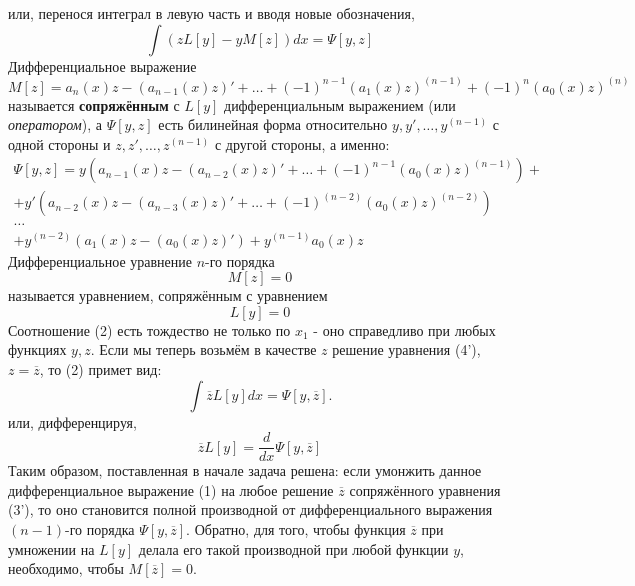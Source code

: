 или, перенося интеграл в левую часть и вводя новые обозначения,
\[
	\int \left( zL[y] - yM[z]\right)dx = \Psi[y,z] \tag{2}
\]
Дифференциальное выражение
\[
	M[z] = a_n(x)z-(a_{n-1}(x)z)' + \dots + (-1)^{n-1} (a_1(x)z)^{(n-1)} + (-1)^n (a_0(x)z)^{(n)} \tag{3}
\]
называется \textbf{сопряжённым} с $L[y]$ дифференциальным выражением (или \textit{оператором}), а $\Psi[y,z]$ есть билинейная форма относительно $y,y',\dots,y^{(n-1)}$ с одной стороны и $z,z',\dots,z^{(n-1)}$ с другой стороны, а именно:
\[
	\begin{aligned}
		\Psi[y,z] = y\left(a_{n-1}(x)z-(a_{n-2}(x)z)'+\dots+(-1)^{n-1}(a_0(x)z)^{(n-1)}\right) + \\
		+ y'\left(a_{n-2}(x)z-(a_{n-3}(x)z)'+\dots + (-1)^{(n-2)}(a_0(x)z)^{(n-2)}\right)\\
		\dots \\
		+ y^{(n-2)}\left(a_1(x)z-(a_0(x)z)' \right) + y^{(n-1)} a_0(x)z
	\end{aligned} \tag{3'}
\]
Дифференциальное уравнение $n$-го порядка
\[
	M[z] = 0 \tag{4'}
\]
называется уравнением, сопряжённым с уравнением
\[
	L[y] = 0 \tag{4}
\]
Соотношение (2) есть тождество не только по $x_1$ - оно справедливо при любых функциях $y,z$. Если мы теперь возьмём в качестве $z$ решение уравнения (4'), $z=\overline{z}$, то (2) примет вид:
\[
	\int \overline{z} L[y]dx = \Psi\left[ y, \overline{z}\right].
\]
или, дифференцируя,
\[
	\overline{z} L[y] = \frac{d}{dx} \Psi \left[ y, \overline{z}\right]
\]
Таким образом, поставленная в начале задача решена: если умонжить данное дифференциальное выражение (1) на любое решение $\overline{z}$ сопряжённого уравнения (3'), то оно становится полной производной от дифференциального выражения $(n-1)$-го порядка $\Psi\left[ y, \overline{z}\right]$. Обратно, для того, чтобы функция $\overline{z}$ при умножении на $L[y]$ делала его такой производной при любой функции $y$, необходимо, чтобы $M\left[ \overline{z}\right]=0$.

